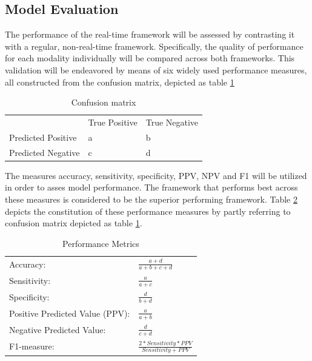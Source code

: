 \documentclass[12pt]{article}
\begin{document}
\subsection{Model Evaluation}
The performance of the real-time framework will be assessed by contrasting it with a regular, non-real-time framework. Specifically, the quality of performance for each modality individually will be compared across both frameworks. This validation will be endeavored by means of six widely used performance measures, all constructed from the confusion matrix, depicted as table  \ref{table:confusion}  
\bigskip
\bgroup
\def\arraystretch{1.6}%
\begin{table}[h]
\centering
\caption{Confusion matrix}
\label{table:confusion}
\begin{tabular}{lll}
                                        & True Positive          & True Negative          \\ \cline{2-3} 
\multicolumn{1}{l|}{Predicted Positive} & \multicolumn{1}{l|}{a} & \multicolumn{1}{l|}{b} \\ \cline{2-3} 
\multicolumn{1}{l|}{Predicted Negative} & \multicolumn{1}{l|}{c} & \multicolumn{1}{l|}{d} \\ \cline{2-3} 
\end{tabular}
\end{table}
\egroup

The measures accuracy, sensitivity, specificity, PPV, NPV and F1 will be utilized in order to asses model performance. The framework that performs best across these measures is considered to be the superior performing framework. Table \ref{table:metrics} depicts the constitution of these performance measures by partly referring to confusion matrix depicted as table \ref{table:confusion}. 
\bigskip
\bgroup
\def\arraystretch{1.8}%
\begin{table}[h]
\centering
\caption{Performance Metrics}
\label{table:metrics}
\begin{tabular}{ll}
\hline
Accuracy:                       & \(\frac{\!\!\!\!\!\!\!\!\!\!\!\!\!\!a+d}{a+b+c+d}\) \\
Sensitivity:                    & \(\frac{a}{a+c}\)                                   \\
Specificity:                    & \(\frac{d}{b+d}\)                                   \\
Positive Predicted Value (PPV): & \(\frac{a}{a+b}\)                                   \\
Negative Predicted Value:       & \(\frac{d}{c+d}\)                                   \\
F1-measure:                     & \(\frac{2*Sensitivity*PPV}{Sensitivity+PPV}\)       \\ \hline
\end{tabular}
\end{table}
\egroup

\newpage



\end{document}
